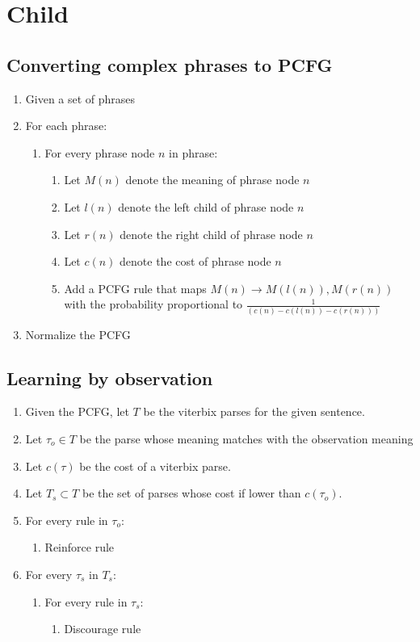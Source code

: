 \documentclass[a4paper]{article}
\begin{document}
\section{Child}
\subsection{Converting complex phrases to PCFG}
\begin{enumerate}
  \item Given a set of phrases
  \item For each phrase:
    \begin{enumerate}
      \item For every phrase node $n$ in phrase:
        \begin{enumerate}
          \item Let $M(n)$ denote the meaning of phrase node $n$
          \item Let $l(n)$ denote the left child of phrase node $n$
          \item Let $r(n)$ denote the right child of phrase node $n$
          \item Let $c(n)$ denote the cost of phrase node $n$
          \item Add a PCFG rule that maps $M(n) \rightarrow M(l(n)),M(r(n))$ with the probability proportional to $\frac{1}{(c(n)-c(l(n))-c(r(n)))}$
        \end{enumerate}
    \end{enumerate}
  \item Normalize the PCFG
\end{enumerate}
\subsection{Learning by observation}
\begin{enumerate}
  \item Given the PCFG, let $T$ be the viterbix parses for the given sentence.
  \item Let $\tau_o \in T$ be the parse whose meaning matches with the observation meaning
  \item Let $c(\tau)$ be the cost of a viterbix parse.
  \item Let $T_s \subset T$ be the set of parses whose cost if lower than $c(\tau_o)$.
  \item For every rule in $\tau_o$:
    \begin{enumerate}
      \item Reinforce rule
    \end{enumerate}
  \item For every $\tau_s$ in $T_s$:
    \begin{enumerate}
      \item For every rule in $\tau_s$:
        \begin{enumerate}
          \item Discourage rule
        \end{enumerate}
    \end{enumerate}
\end{enumerate}

\end{document}
